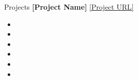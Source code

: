\begin{rSection}{Projects}
\vspace{0.12cm}
{\bf [Project Name]}
\hspace{2 cm}{[Technologies Used]}
\hfill{\href{[Project URL]}{[Project URL]}}
\begin{itemize}[label=\myfancylabel, leftmargin=0.5cm, topsep=-5pt, itemsep=-1ex]
\setlength\itemsep{-0.25cm}
    \item[$\bullet$]  [Brief description of the project, including its purpose and functionality]
    \item[$\bullet$]  [Key feature or implementation detail 1]
    \item[$\bullet$]  [Key feature or implementation detail 2]
    \item[$\bullet$]  [Key feature or implementation detail 3]
    \item[$\bullet$]  [Key feature or implementation detail 4]
    \item[$\bullet$]  [Key feature or implementation detail 5]
\end{itemize}
\end{rSection}
